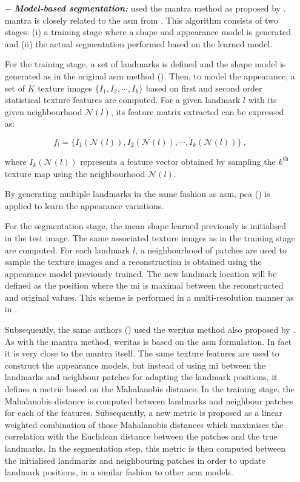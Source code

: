 \begin{enumerate}[leftmargin=*]
\item[$-$] \textbf{\textit{Model-based segmentation:}} \cite{Viswanath2008a,Viswanath2009} used the \ac{mantra} method as proposed by \cite{Toth2008}. \ac{mantra} is closely related to the \ac{asm} from \cite{Cootes1995}. This algorithm consists of two stages: (i) a training stage where a shape and appearance model is generated and (ii) the actual segmentation performed based on the learned model. 

For the training stage, a set of landmarks is defined and the shape model is generated as in the original \ac{asm} method (\cite{Cootes1995}). Then, to model the appearance, a set of $K$ texture images $\{I_1,I_2,\cdots,I_k\}$ based on first and second order statistical texture features are computed. For a given landmark $l$ with its given neighbourhood $\mathcal{N}(l)$, its feature matrix extracted can be expressed as:

\begin{equation}
	f_l = \{ I_1(\mathcal{N}(l)), I_2(\mathcal{N}(l)), \cdots, I_k(\mathcal{N}(l)) \} \ ,
	\label{eq:mantra1}
\end{equation}

\noindent where $I_k(\mathcal{N}(l))$ represents a feature vector obtained by sampling the $k^{\text{th}}$ texture map using the neighbourhood $\mathcal{N}(l)$.

By generating multiple landmarks in the same fashion as \ac{asm}, \ac{pca} (\cite{Pearson1901}) is applied to learn the appearance variations.

For the segmentation stage, the mean shape learned previously is initialised in the test image. The same associated texture images as in the training stage are computed. For each landmark $l$, a neighbourhood of patches are used to sample the texture images and a reconstruction is obtained using the appearance model previously trained. The new landmark location will be defined as the position where the \ac{mi} is maximal between the reconstructed and original values. This scheme is performed in a multi-resolution manner as in \cite{Cootes1995}.

Subsequently, the same authors (\cite{Viswanath2012}) used the \ac{weritas} method also proposed by \cite{Toth2009}. As with the \ac{mantra} method, \ac{weritas} is based on the \ac{asm} formulation. In fact it is very close to the \ac{mantra} itself. The same texture features are used to construct the appearance models, but instead of using \ac{mi} between the landmarks and neighbour patches for adapting the landmark positions, it defines a metric based on the Mahalanobis distance. In the training stage, the Mahalanobis distance is computed between landmarks and neighbour patches for each of the features. Subsequently, a new metric is proposed as a linear weighted combination of those Mahalanobis distances which maximises the correlation with the Euclidean distance between the patches and the true landmarks. In the segmentation step, this metric is then computed between the initialised landmarks and neighbouring patches in order to update landmark positions, in a similar fashion to other \ac{acm} models. 


\end{enumerate}
